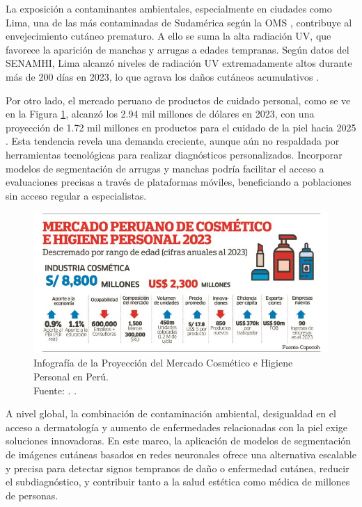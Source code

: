 La exposición a contaminantes ambientales, especialmente en ciudades como Lima, una de las más contaminadas de Sudamérica según la OMS \parencite{who2023air}, contribuye al envejecimiento cutáneo prematuro. A ello se suma la alta radiación UV, que favorece la aparición de manchas y arrugas a edades tempranas. Según datos del SENAMHI, Lima alcanzó niveles de radiación UV extremadamente altos durante más de 200 días en 2023, lo que agrava los daños cutáneos acumulativos \parencite{senamhi2023uv}.

Por otro lado, el mercado peruano de productos de cuidado personal, como se ve en la Figura \ref{1:fig4}, alcanzó los 2.94 mil millones de dólares en 2023, con una proyección de 1.72 mil millones en productos para el cuidado de la piel hacia 2025 \parencite{statista2023peru}. Esta tendencia revela una demanda creciente, aunque aún no respaldada por herramientas tecnológicas para realizar diagnósticos personalizados. Incorporar modelos de segmentación de arrugas y manchas podría facilitar el acceso a evaluaciones precisas a través de plataformas móviles, beneficiando a poblaciones sin acceso regular a especialistas.

\begin{figure}[H]
	\begin{center}
		\includegraphics[width=1\textwidth]{1/figures/careperu.jpg}
		\caption[Infografía de la Proyección del Mercado Cosmético e Higiene Personal en Perú]{Infografía de la Proyección del Mercado Cosmético e Higiene Personal en Perú.\\
			Fuente: \cite{elperuano2025belleza}. .}
		\label{1:fig4}
	\end{center}
\end{figure}

A nivel global, la combinación de contaminación ambiental, desigualdad en el acceso a dermatología y aumento de enfermedades relacionadas con la piel exige soluciones innovadoras. En este marco, la aplicación de modelos de segmentación de imágenes cutáneas basados en redes neuronales ofrece una alternativa escalable y precisa para detectar signos tempranos de daño o enfermedad cutánea, reducir el subdiagnóstico, y contribuir tanto a la salud estética como médica de millones de personas.

